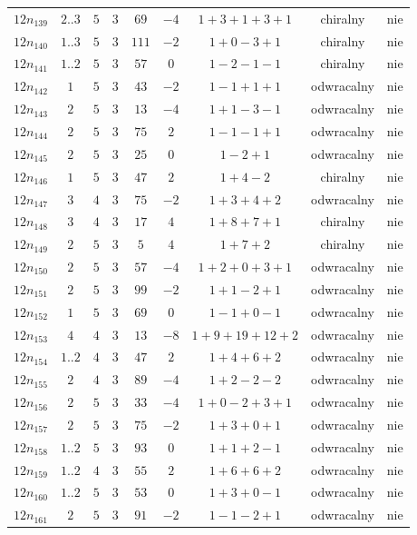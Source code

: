 \begin{longtable}{ccccccccc}
$12n_{139}$ & $2..3$ & $5$ & $3$ & $69$ & $-4$ & $1+3+1+3+1$ & chiralny & nie \\
$12n_{140}$ & $1..3$ & $5$ & $3$ & $111$ & $-2$ & $1+0-3+1$ & chiralny & nie \\
$12n_{141}$ & $1..2$ & $5$ & $3$ & $57$ & $0$ & $1-2-1-1$ & chiralny & nie \\
$12n_{142}$ & $1$ & $5$ & $3$ & $43$ & $-2$ & $1-1+1+1$ & odwracalny & nie \\
$12n_{143}$ & $2$ & $5$ & $3$ & $13$ & $-4$ & $1+1-3-1$ & odwracalny & nie \\
$12n_{144}$ & $2$ & $5$ & $3$ & $75$ & $2$ & $1-1-1+1$ & odwracalny & nie \\
$12n_{145}$ & $2$ & $5$ & $3$ & $25$ & $0$ & $1-2+1$ & odwracalny & nie \\
$12n_{146}$ & $1$ & $5$ & $3$ & $47$ & $2$ & $1+4-2$ & chiralny & nie \\
$12n_{147}$ & $3$ & $4$ & $3$ & $75$ & $-2$ & $1+3+4+2$ & odwracalny & nie \\
$12n_{148}$ & $3$ & $4$ & $3$ & $17$ & $4$ & $1+8+7+1$ & chiralny & nie \\
$12n_{149}$ & $2$ & $5$ & $3$ & $5$ & $4$ & $1+7+2$ & chiralny & nie \\
$12n_{150}$ & $2$ & $5$ & $3$ & $57$ & $-4$ & $1+2+0+3+1$ & odwracalny & nie \\
$12n_{151}$ & $2$ & $5$ & $3$ & $99$ & $-2$ & $1+1-2+1$ & odwracalny & nie \\
$12n_{152}$ & $1$ & $5$ & $3$ & $69$ & $0$ & $1-1+0-1$ & odwracalny & nie \\
$12n_{153}$ & $4$ & $4$ & $3$ & $13$ & $-8$ & $1+9+19+12+2$ & odwracalny & nie \\
$12n_{154}$ & $1..2$ & $4$ & $3$ & $47$ & $2$ & $1+4+6+2$ & odwracalny & nie \\
$12n_{155}$ & $2$ & $4$ & $3$ & $89$ & $-4$ & $1+2-2-2$ & odwracalny & nie \\
$12n_{156}$ & $2$ & $5$ & $3$ & $33$ & $-4$ & $1+0-2+3+1$ & odwracalny & nie \\
$12n_{157}$ & $2$ & $5$ & $3$ & $75$ & $-2$ & $1+3+0+1$ & odwracalny & nie \\
$12n_{158}$ & $1..2$ & $5$ & $3$ & $93$ & $0$ & $1+1+2-1$ & odwracalny & nie \\
$12n_{159}$ & $1..2$ & $4$ & $3$ & $55$ & $2$ & $1+6+6+2$ & odwracalny & nie \\
$12n_{160}$ & $1..2$ & $5$ & $3$ & $53$ & $0$ & $1+3+0-1$ & odwracalny & nie \\
$12n_{161}$ & $2$ & $5$ & $3$ & $91$ & $-2$ & $1-1-2+1$ & odwracalny & nie \\

\end{longtable}
